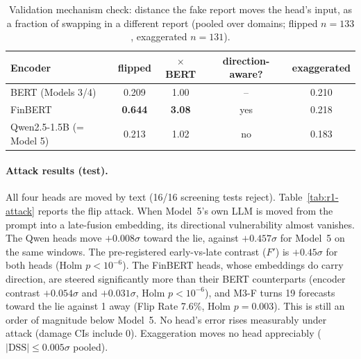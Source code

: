 \begin{table}[t]
\centering\small
\caption{Validation mechanism check: distance the fake report moves the head's input, as a
fraction of swapping in a different report (pooled over domains; flipped $n{=}133$,
exaggerated $n{=}131$).}
\label{tab:r1-mech}
\begin{tabular}{lcccc}
\toprule
Encoder & flipped & $\times$ BERT & direction-aware? & exaggerated \\
\midrule
BERT (Models 3/4) & 0.209 & 1.00 & -- & 0.210 \\
FinBERT & \textbf{0.644} & \textbf{3.08} & yes & 0.218 \\
Qwen2.5-1.5B (= Model 5) & 0.213 & 1.02 & no & 0.183 \\
\bottomrule
\end{tabular}
\end{table}

\paragraph{Attack results (test).}
All four heads are moved by text (16/16 screening tests reject). Table~\ref{tab:r1-attack}
reports the flip attack. When Model~5's own LLM is moved from the prompt into a late-fusion
embedding, its directional vulnerability almost vanishes. The Qwen heads move $+0.008\sigma$
toward the lie, against $+0.457\sigma$ for Model~5 on the same windows. The pre-registered
early-vs-late contrast ($F'$) is $+0.45\sigma$ for both heads (Holm $p<10^{-6}$). The FinBERT
heads, whose embeddings do carry direction, are steered significantly more than their BERT
counterparts (encoder contrast $+0.054\sigma$ and $+0.031\sigma$, Holm $p<10^{-6}$), and M3-F
turns 19 forecasts toward the lie against 1 away (Flip Rate 7.6\%, Holm $p=0.003$). This is
still an order of magnitude below Model~5. No head's error rises measurably under attack
(damage CIs include 0). Exaggeration moves no head appreciably ($|\mathrm{DSS}|\le0.005\sigma$
pooled).

